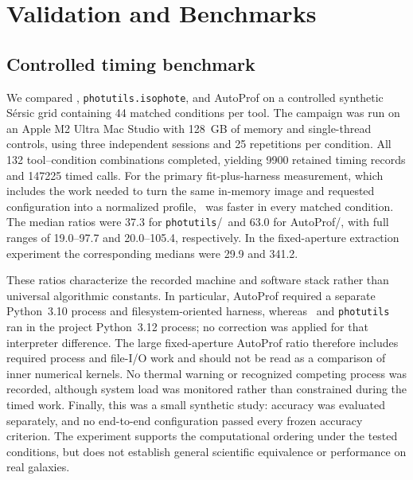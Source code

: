 \section{Validation and Benchmarks}\label{sec:validation}

\subsection{Controlled timing benchmark}\label{sec:timing_benchmark}

We compared \isoster, \texttt{photutils.isophote}, and AutoProf on a controlled
synthetic S\'ersic grid containing 44 matched conditions per tool.  The campaign
was run on an Apple M2 Ultra Mac Studio with 128~GB of memory and single-thread
controls, using three independent sessions and 25 repetitions per condition.
All 132 tool--condition combinations completed, yielding 9900 retained timing
records and 147225 timed calls.  For the primary fit-plus-harness measurement,
which includes the work needed to turn the same in-memory image and requested
configuration into a normalized profile, \isoster\ was faster in every matched
condition.  The median ratios were 37.3 for
\texttt{photutils}/\isoster\ and 63.0 for AutoProf/\isoster, with full ranges of
19.0--97.7 and 20.0--105.4, respectively.  In the fixed-aperture extraction
experiment the corresponding medians were 29.9 and 341.2.

These ratios characterize the recorded machine and software stack rather than
universal algorithmic constants.  In particular, AutoProf required a separate
Python~3.10 process and filesystem-oriented harness, whereas \isoster\ and
\texttt{photutils} ran in the project Python~3.12 process; no correction was
applied for that interpreter difference.  The large fixed-aperture AutoProf
ratio therefore includes required process and file-I/O work and should not be
read as a comparison of inner numerical kernels.  No thermal warning or
recognized competing process was recorded, although system load was monitored
rather than constrained during the timed work.  Finally, this was a small
synthetic study: accuracy was evaluated separately, and no end-to-end
configuration passed every frozen accuracy criterion.  The experiment supports
the computational ordering under the tested conditions, but does not establish
general scientific equivalence or performance on real galaxies.
